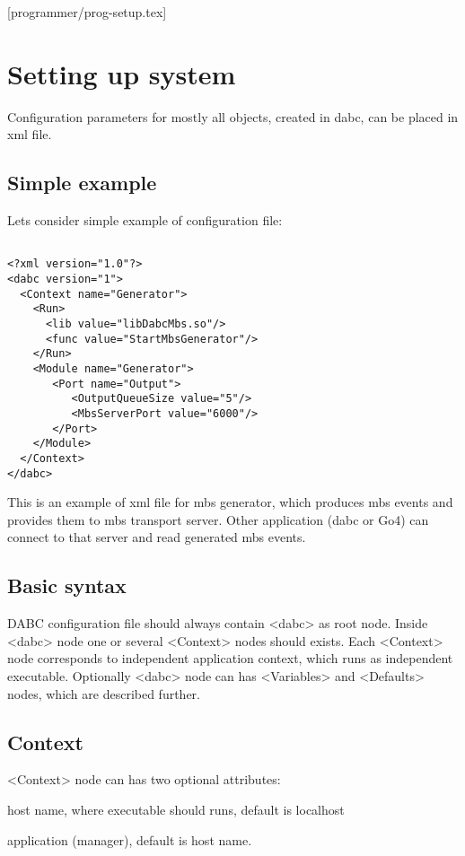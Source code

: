 [programmer/prog-setup.tex]
\section{Setting up system}

Configuration parameters for mostly all objects, created in dabc, 
can be placed in xml file. 



\subsection{Simple example}

Lets consider simple example of configuration file:

\begin{verbatim}

<?xml version="1.0"?>
<dabc version="1">
  <Context name="Generator">
    <Run>
      <lib value="libDabcMbs.so"/>
      <func value="StartMbsGenerator"/>
    </Run>
    <Module name="Generator">
       <Port name="Output">
          <OutputQueueSize value="5"/>
          <MbsServerPort value="6000"/>
       </Port>
    </Module>
  </Context>
</dabc>

\end{verbatim}

This is an example of xml file for mbs generator, which produces 
mbs events and provides them to mbs transport server. Other application
(dabc or Go4) can connect to that server and read generated mbs events.

\subsection{Basic syntax}

DABC configuration file should always contain <dabc> as root node. 
Inside <dabc> node one or several <Context> nodes should exists.
Each <Context> node corresponds to independent application context, which runs as
independent executable. 
Optionally <dabc> node can has <Variables> and <Defaults> nodes, which are described further. 

\subsection{Context}

<Context> node can has two optional attributes:
\bdes
\item["host"] host name, where executable should runs, default is localhost
\item["name"] application (manager), default is host name.
\edes


